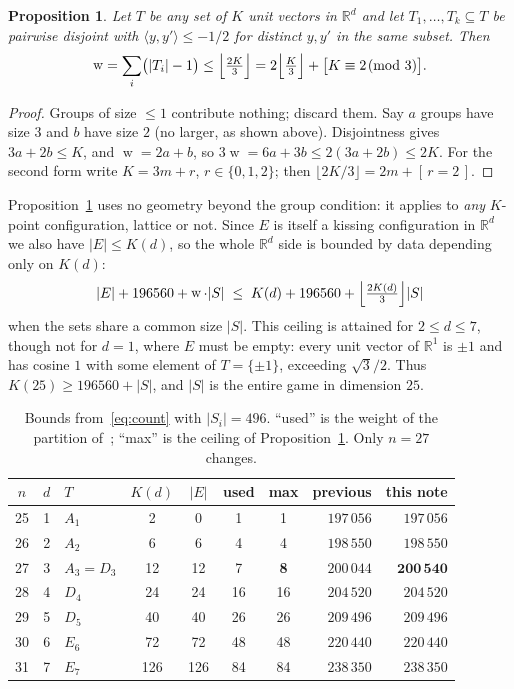 \documentclass[11pt,reqno]{amsart}
\theoremstyle{plain}
\newtheorem{proposition}[theorem]{Proposition}
\theoremstyle{remark}
\newcommand{\R}{\mathbb{R}}
\newcommand{\ip}[2]{\langle #1, #2\rangle}
\DeclareMathOperator{\wt}{w}
\begin{document}
\begin{proposition}\label{prop:weight}
Let $T$ be any set of $K$ unit vectors in $\R^{d}$ and let
$T_{1},\dots,T_{k} \subseteq T$ be pairwise disjoint with $\ip{y}{y'} \le -1/2$
for distinct $y,y'$ in the same subset.  Then
\[
  \wt = \sum_{i}\bigl(|T_{i}|-1\bigr)
      \le \Bigl\lfloor \tfrac{2K}{3}\Bigr\rfloor
      = 2\Bigl\lfloor \tfrac{K}{3}\Bigr\rfloor + \bigl[K \equiv 2 \!\!\pmod 3\bigr].
\]
\end{proposition}

\begin{proof}
Groups of size $\le 1$ contribute nothing; discard them.  Say $a$ groups have
size $3$ and $b$ have size $2$ (no larger, as shown above).  Disjointness gives
$3a+2b \le K$, and $\wt = 2a+b$, so $3\wt = 6a+3b \le 2(3a+2b) \le 2K$.  For the
second form write $K = 3m+r$, $r \in \{0,1,2\}$; then
$\lfloor 2K/3\rfloor = 2m + [\,r=2\,]$.
\end{proof}

Proposition~\ref{prop:weight} uses no geometry beyond the group condition: it
applies to \emph{any} $K$-point configuration, lattice or not.  Since $E$ is
itself a kissing configuration in $\R^{d}$ we also have $|E| \le K(d)$, so the
whole $\R^{d}$ side is bounded by data depending only on $K(d)$:
\begin{equation}\label{eq:ceiling}
  |E| + 196560 + \wt\cdot|S|
  \;\le\; K(d) + 196560 + \Bigl\lfloor\tfrac{2K(d)}{3}\Bigr\rfloor|S|
\end{equation}
when the sets share a common size $|S|$.  This ceiling is attained for
$2 \le d \le 7$, though not for $d = 1$, where $E$ must be empty: every unit
vector of $\R^{1}$ is $\pm1$ and has cosine $1$ with some element of
$T = \{\pm1\}$, exceeding $\sqrt3/2$.  Thus $K(25) \ge 196560 + |S|$, and $|S|$ is
the entire game in dimension $25$.

\begin{table}[t]
\caption{Bounds from~\eqref{eq:count} with $|S_{i}| = 496$.  ``used'' is the
weight of the partition of~\cite{Ma2025}; ``max'' is the ceiling of
Proposition~\ref{prop:weight}.  Only $n = 27$ changes.}
\label{tab:bounds}
\centering
\begin{tabular}{@{}cclccccrr@{}}
\toprule
$n$ & $d$ & $T$ & $K(d)$ & $|E|$ & used & max & previous & this note \\
\midrule
25 & 1 & $A_{1}$       & 2   & 0   & 1  & 1  & $197\,056$ & $197\,056$ \\
26 & 2 & $A_{2}$       & 6   & 6   & 4  & 4  & $198\,550$ & $198\,550$ \\
27 & 3 & $A_{3}=D_{3}$ & 12  & 12  & 7  & \textbf{8} & $200\,044$ & $\mathbf{200\,540}$ \\
28 & 4 & $D_{4}$       & 24  & 24  & 16 & 16 & $204\,520$ & $204\,520$ \\
29 & 5 & $D_{5}$       & 40  & 40  & 26 & 26 & $209\,496$ & $209\,496$ \\
30 & 6 & $E_{6}$       & 72  & 72  & 48 & 48 & $220\,440$ & $220\,440$ \\
31 & 7 & $E_{7}$       & 126 & 126 & 84 & 84 & $238\,350$ & $238\,350$ \\
\bottomrule
\end{tabular}
\end{table}
\end{document}
